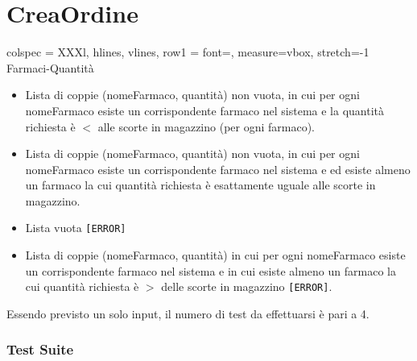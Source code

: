 \section{CreaOrdine}

\begin{table}[!hbp]
	\centering
	\footnotesize
	\begin{tblr}{
		colspec = XXXl,
		hlines, vlines,
		row{1} = {font=\bfseries},
		measure=vbox, stretch=-1
		}
		Farmaci-Quantità \\
		\begin{itemize}[leftmargin=*]
			\item Lista di coppie (nomeFarmaco, quantità) non vuota, in cui per ogni nomeFarmaco esiste un corrispondente farmaco nel sistema e la quantità richiesta è $<$ alle scorte in magazzino (per ogni farmaco).
			\item Lista di coppie (nomeFarmaco, quantità) non vuota, in cui per ogni nomeFarmaco esiste un corrispondente farmaco nel sistema e ed esiste almeno un farmaco la cui quantità richiesta è esattamente uguale alle scorte in magazzino.
			\item Lista vuota \texttt{[ERROR]}
			\item Lista di coppie (nomeFarmaco, quantità) in cui per ogni nomeFarmaco esiste un corrispondente farmaco nel sistema e in cui esiste almeno un farmaco la cui quantità richiesta è $>$ delle scorte in magazzino \texttt{[ERROR]}.
		\end{itemize}
	\end{tblr}
\end{table}

\noindent Essendo previsto un solo input, il numero di test da effettuarsi è pari a 4.

\subsubsection*{Test Suite}

